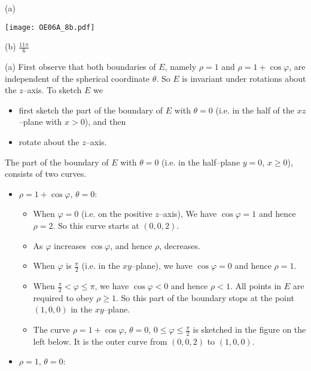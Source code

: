 %

\begin{answer}
(a)
\begin{center}
     \texttt{[image: OE06A\_8b.pdf]}
\end{center}

(b) $\frac{11\pi}{6}$
\end{answer}

\begin{solution}
(a)
First observe that both boundaries of $E$, namely $\rho=1$ and 
$\rho= 1 + \cos\varphi$, are independent of the spherical coordinate
$\theta$. So $E$ is invariant under rotations about the $z$--axis.
To sketch $E$ we
\begin{itemize}
\item
first sketch the part of the boundary of $E$ with $\theta=0$
(i.e. in the half of the $xz$--plane with $x>0$), and then

\item
rotate about the $z$--axis.
\end{itemize}
The part of the boundary of $E$ with $\theta=0$ (i.e. 
in the half--plane $y=0$, $x\ge 0$), consists of two curves.
\begin{itemize}
\item
$\rho=1+\cos\varphi$, $\theta=0$:\ \ \ 
\begin{itemize}
\item When $\varphi=0$ (i.e. on the positive $z$--axis),
We have $\cos\varphi =1$ and hence $\rho=2$.  So this curve starts
at $(0,0,2)$.
\item 
As $\varphi$ increases $\cos\varphi$, and hence $\rho$,
decreases.
\item
When $\varphi$ is $\frac{\pi}{2}$ (i.e. in the $xy$--plane),
we have $\cos\varphi =0$ and hence $\rho=1$.
\item 
When $\frac{\pi}{2}<\varphi\le \pi$, we have $\cos\varphi<0$ and hence
$\rho<1$. All points in $E$ are required to obey $\rho\ge 1$. So
this part of the boundary stops at the point $(1,0,0)$ in the $xy$--plane.
\item 
The curve $\rho=1+\cos\varphi$, $\theta=0$, $0\le\varphi\le\frac{\pi}{2}$
is sketched in the figure on the left below. It is the outer curve from
$(0,0,2)$ to $(1,0,0)$.
 
\end{itemize}
 
\item
$\rho=1$, $\theta=0$:\ \ \ 


\end{itemize}
\end{solution}
